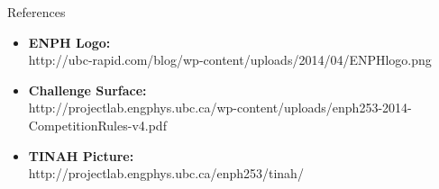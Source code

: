 \documentclass[aspectratio=43]{beamer}
\begin{document}
  \begin{frame}{References}
    \begin{itemize}
      \item \textbf{ENPH Logo:} \\http://ubc-rapid.com/blog/wp-content/uploads/2014/04/ENPHlogo.png
      \item \textbf{Challenge Surface:} \\http://projectlab.engphys.ubc.ca/wp-content/uploads/enph253-2014-CompetitionRules-v4.pdf
      \item \textbf{TINAH Picture:} \\http://projectlab.engphys.ubc.ca/enph253/tinah/
    \end{itemize}
  \end{frame}
\end{document}
